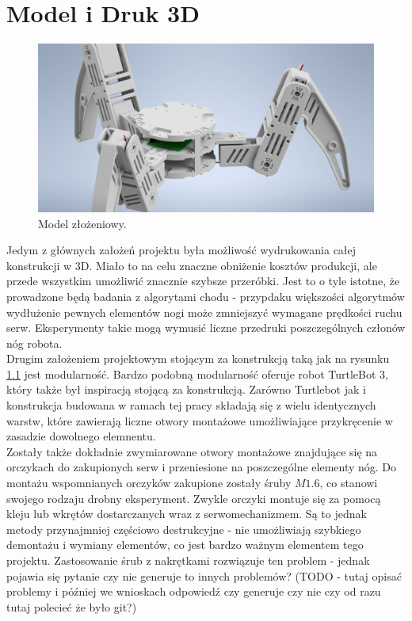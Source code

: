 \chapter{Model i Druk 3D}
\begin{figure}[H]
\includegraphics[width=\textwidth]{img/CAD_assembly.png}
\caption{Model złożeniowy.}
\label{CAD_assembly}
\end{figure}
Jedym z głównych założeń projektu była możliwość wydrukowania całej konstrukcji w 3D. Miało to na celu znaczne obniżenie kosztów produkcji, ale przede wszystkim umożliwić znacznie szybsze przeróbki. Jest to o tyle istotne, że prowadzone będą badania z algorytami chodu - przypdaku większości algorytmów wydłużenie pewnych elementów nogi może zmniejszyć wymagane prędkości ruchu serw. Eksperymenty takie mogą wymusić liczne przedruki poszczególnych członów nóg robota.\\

Drugim założeniem projektowym stojącym za konstrukcją taką jak na rysunku \ref{CAD_assembly} jest modularność. Bardzo podobną modularność oferuje robot TurtleBot 3, który także był inspiracją stojącą za konstrukcją. Zarówno Turtlebot jak i konstrukcja budowana w ramach tej pracy składają się z wielu identycznych warstw, które zawierają liczne otwory montażowe umożliwiające przykręcenie w zasadzie dowolnego elemnentu.\\

Zostały także dokładnie zwymiarowane otwory montażowe znajdujące się na orczykach do zakupionych serw i przeniesione na poszczególne elementy nóg. Do montażu wspomnianych orczyków zakupione zostały śruby $M1.6$, co stanowi swojego rodzaju drobny eksperyment. Zwykle orczyki montuje się za pomocą kleju lub wkrętów dostarczanych wraz z serwomechanizmem. Są to jednak metody przynajmniej częściowo destrukcyjne - nie umożliwiają szybkiego demontażu i wymiany elementów, co jest bardzo ważnym elementem tego projektu. Zastosowanie śrub z nakrętkami rozwiązuje ten problem - jednak pojawia się pytanie czy nie generuje to innych problemów? (TODO - tutaj opisać problemy i później we wnioskach odpowiedź czy generuje czy nie czy od razu tutaj polecieć że było git?)\\

